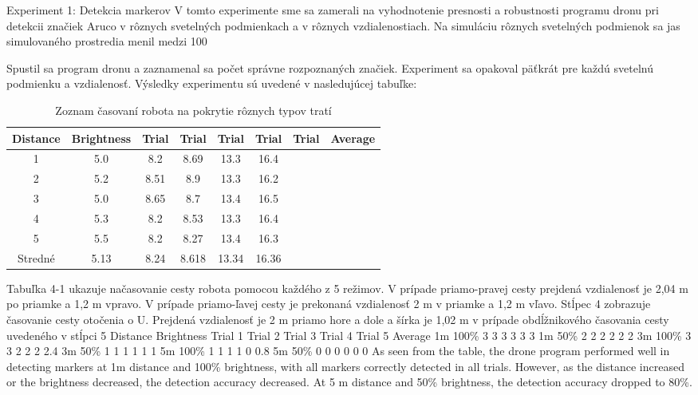 Experiment 1: Detekcia markerov
V tomto experimente sme sa zamerali na vyhodnotenie presnosti a robustnosti programu dronu pri detekcii značiek Aruco v rôznych svetelných podmienkach a v rôznych vzdialenostiach. Na simuláciu rôznych svetelných podmienok sa jas simulovaného prostredia menil medzi 100 %

Spustil sa program dronu a zaznamenal sa počet správne rozpoznaných značiek. Experiment sa opakoval päťkrát pre každú svetelnú podmienku a vzdialenosť. Výsledky experimentu sú uvedené v nasledujúcej tabuľke:

\begin{table}[h!] 
    \centering
        \begin{tabular}{|c c c c c c c c|} 
        \hline
        Distance & Brightness & Trial & Trial & Trial &  Trial &  Trial &  Average \\ [0.5ex] 
        \hline\hline
        1 & 5.0 & 8.2 & 8.69 & 13.3 & 16.4\\ 
        \hline
        2 & 5.2 & 8.51 & 8.9 & 13.3 & 16.2\\
        \hline
        3 & 5.0 & 8.65 & 8.7 & 13.4 & 16.5\\
        \hline
        4 & 5.3 & 8.2 & 8.53 & 13.3 & 16.4\\
        \hline
        5 & 5.5 & 8.2 & 8.27 & 13.4 & 16.3\\
        \hline
        Stredné & 5.13 & 8.24 & 8.618 & 13.34 & 16.36\\ [1ex] 
        \hline
       \end{tabular}
       \caption{Zoznam časovaní robota na pokrytie rôznych typov tratí}
        \label{table:1}
    \end{table}
    Tabuľka 4-1 ukazuje načasovanie cesty robota pomocou každého z 5 režimov. 
    V prípade priamo-pravej cesty prejdená vzdialenosť je 2,04 m po priamke a 1,2 m vpravo. 
    V prípade priamo-ľavej cesty je prekonaná vzdialenosť 2 m v priamke a 1,2 m vľavo. 
    Stĺpec 4 zobrazuje časovanie cesty otočenia o U. Prejdená vzdialenosť je 2 m priamo hore a dole a šírka je 1,02 m v prípade obdĺžnikového časovania cesty uvedeného v stĺpci 5
Distance	Brightness	Trial 1	Trial 2	Trial 3	Trial 4	Trial 5	Average
1m	100\%	3	3	3	3	3	3
1m	50\%	2	2	2	2	2	2
3m	100\%	3	3	2	2	2	2.4
3m	50\%	1	1	1	1	1	1
5m	100\%	1	1	1	1	0	0.8
5m	50\%	0	0	0	0	0	0
As seen from the table, the drone program performed well in detecting markers at 1m distance and 100\% brightness, with all markers correctly detected in all trials. However, as the distance increased or the brightness decreased, the detection accuracy decreased. At 5 m distance and 50\% brightness, the detection accuracy dropped to 80\%.
